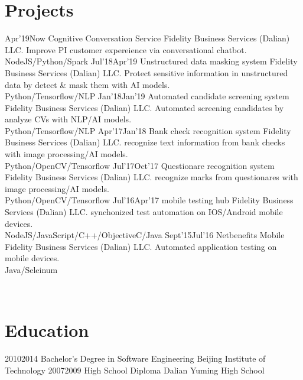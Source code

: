 \documentclass[]{friggeri-cv}
\begin{document}
\section{Projects}
\begin{entrylist}
  \entry
    {Apr'19}{Now}
    {Cognitive Conversation Service}
    {Fidelity Business Services (Dalian) LLC.}
    {Improve PI customer expereience via conversational chatbot.\\
     NodeJS/Python/Spark }
  \entry
    {Jul'18}{Apr'19}
    {Unstructured data masking system}
    {Fidelity Business Services (Dalian) LLC.}
    {Protect sensitive information in unstructured data by detect \& mask them with AI models.\\
     Python/Tensorflow/NLP }
  \entry
    {Jan'18}{Jan'19}
    {Automated candidate screening system}
    {Fidelity Business Services (Dalian) LLC.}
    {Automated screening candidates by analyze CVs with NLP/AI models.\\
     Python/Tensorflow/NLP}
  \entry
    {Apr'17}{Jan'18}
    {Bank check recognition system}
    {Fidelity Business Services (Dalian) LLC.}
    {recognize text information from bank checks with image processing/AI models.\\
     Python/OpenCV/Tensorflow}
  \entry
    {Jul'17}{Oct'17}
    {Questionare recognition system}
    {Fidelity Business Services (Dalian) LLC.}
    {recognize marks from questionares with image processing/AI models.\\
     Python/OpenCV/Tensorflow}
  \entry
    {Jul'16}{Apr'17}
    {mobile testing hub}
    {Fidelity Business Services (Dalian) LLC.}
    {synchonized test automation on IOS/Android mobile devices.\\
     NodeJS/JavaScript/C++/ObjectiveC/Java}
  \entry
    {Sept'15}{Jul'16}
    {Netbenefits Mobile}
    {Fidelity Business Services (Dalian) LLC.}
    {Automated application testing on mobile devices.\\
     Java/Seleinum}
\end{entrylist}
~
\section{Education}
\begin{entrylist}
  \entry
    {2010}{2014}
    {Bachelor's Degree in Software Engineering}
    {Beijing Institute of Technology}
    {}
  \entry
    {2007}{2009}
    {High School Diploma}
    {Dalian Yuming High School}
    {}
\end{entrylist}
\end{document}

